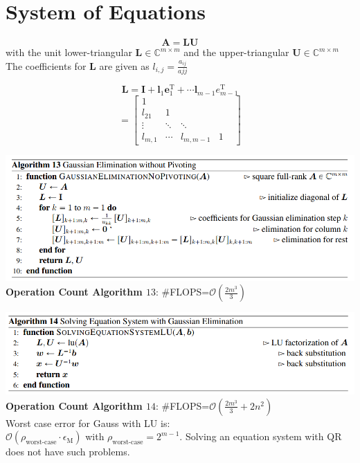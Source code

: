 \documentclass[english]{latex4ei/latex4ei_sheet}
\begin{document}
\section{System of Equations}
\begin{sectionbox}
$$\mathbf{A} = \mathbf{L}\mathbf{U}$$
with the unit lower-triangular $\mathbf{L} \in\mathbb{C}^{m\times m}$ and the upper-triangular $\mathbf{U}\in\mathbb{C}^{m\times m}$
The coefficients for $\mathbf{L}$ are given as  $l_{i,j} = \frac{a_{ij}}{ajj}$

$$\mathbf{L} = \mathbf{I}+\mathbf{l}_1\mathbf{e}^\text{T}_1+\cdots\mathbf{l}_{m-1}e^\text{T}_{m-1}$$
$$=\begin{bmatrix}
1 & & & &\\
l_{21} & 1 & & &\\
\vdots & \ddots & \ddots & & \\
l_{m,1} & \cdots & l_{m,m-1} & 1
\end{bmatrix}$$

\end{sectionbox}
\begin{sectionbox}
\includegraphics[width=\textwidth]{img/algo13_gauss_without_pivo.PNG}
\textbf{Operation Count Algorithm $13$}: \#FLOPS=$\mathcal{O}(\frac{2m^3}{3})$

\end{sectionbox}
\begin{sectionbox}
\includegraphics[width=\textwidth]{img/algo14_solve_with_gauss.PNG}
\textbf{Operation Count Algorithm $14$}: \#FLOPS=$\mathcal{O}(\frac{2m^3}{3} + 2n^2)$\\
Worst case error for Gauss with LU is:\\
$\mathcal{O}(\rho_{\text{worst-case}} \cdot \epsilon_\text{M})$ with $\rho_{\text{worst-case}} = 2^{m-1}$. Solving an equation system with QR does not have such problems.
\end{sectionbox}
\end{document}
